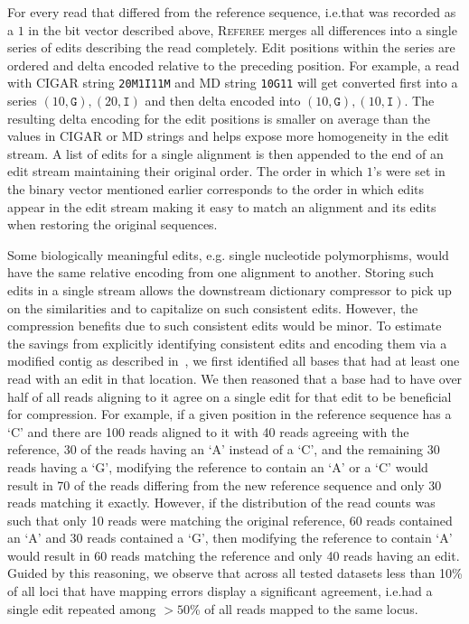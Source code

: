 \documentclass[12pt]{cmuthesis}
\newcommand{\refer}{\textsc{Referee}\xspace}
\begin{document}
  For every read that differed from the reference sequence, i.e.\@ that was recorded as a $1$ in the bit vector described above, \refer merges all differences into a single series of edits describing the read completely. Edit positions within the series are ordered and delta encoded relative to the preceding position. For example, a read with CIGAR string \texttt{20M1I11M} and MD string \texttt{10G11} will get converted first into a series $(10, \texttt{G}), (20, \texttt{I})$ and then delta encoded into $(10, \texttt{G}), (10, \texttt{I})$. The resulting delta encoding for the edit positions is smaller on average than the values in CIGAR or MD strings and helps expose more homogeneity in the edit stream. A list of edits for a single alignment is then appended to the end of an edit stream maintaining their original order. The order in which $1$'s were set in the binary vector mentioned earlier corresponds to the order in which edits appear in the edit stream making it easy to match an alignment and its edits when restoring the original sequences. 

  Some biologically meaningful edits, e.g. single nucleotide polymorphisms, would have the same relative encoding from one alignment to another. Storing such edits in a single stream allows the downstream dictionary compressor to pick up on the similarities and to capitalize on such consistent edits. However, the compression benefits due to such consistent edits would be minor. To estimate the savings from explicitly identifying consistent edits and encoding them via a modified contig as described in~\cite{Sahinalp2015}, we first identified all bases that had at least one read with an edit in that location. We then reasoned that a base had to have over half of all reads aligning to it agree on a single edit for that edit to be beneficial for compression. For example, if a given position in the reference sequence has a `C' and there are 100 reads aligned to it with 40 reads agreeing with the reference, 30 of the reads having an `A' instead of a `C', and the remaining 30 reads having a `G', modifying the reference to contain an `A' or a `C' would result in 70 of the reads differing from the new reference sequence and only 30 reads matching it exactly. However, if the distribution of the read counts was such that only 10 reads were matching the original reference, 60 reads contained an `A' and 30 reads contained a `G', then modifying the reference to contain `A' would result in 60 reads matching the reference and only 40 reads having an edit. Guided by this reasoning, we observe that across all tested datasets less than 10\% of all loci that have mapping errors display a significant agreement, i.e.\@ had a single edit repeated among $>50$\% of all reads mapped to the same locus.
\end{document}
